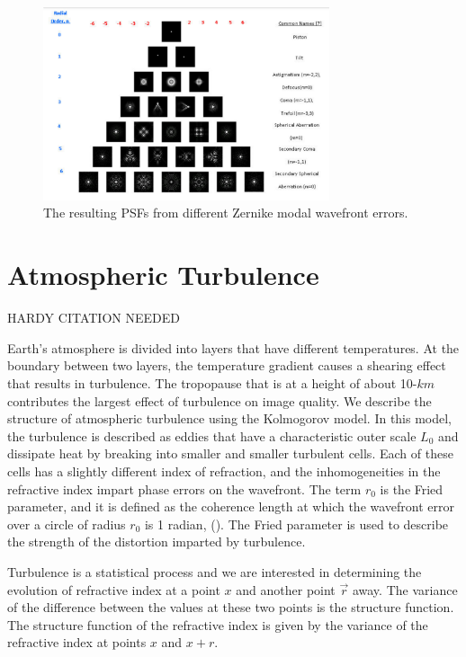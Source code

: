 \begin{figure}
    \centering
    \includegraphics[width=0.75\textwidth]{Chapter Materials/Introduction Materials/Introduction Figures/ZernikePSFs.png}
    \caption{The resulting PSFs from different Zernike modal wavefront errors.}
    \label{fig:zernikePSFs}
\end{figure}

\section{Atmospheric Turbulence}
HARDY CITATION NEEDED


Earth’s atmosphere is divided into layers that have different temperatures. At the boundary between two layers, the temperature gradient causes a shearing effect that results in turbulence. The tropopause that is at a height of about 10-$km$ contributes the largest effect of turbulence on image quality. We describe the structure of atmospheric turbulence using the Kolmogorov model. In this model, the turbulence is described as eddies that have a characteristic outer scale $L_0$ and dissipate heat by breaking into smaller and smaller turbulent cells. Each of these cells has a slightly different index of refraction, and the inhomogeneities in the refractive index impart phase errors on the wavefront. The term $r_0$ is the Fried parameter, and it is defined as the coherence length at which the wavefront error over a circle of radius $r_0$ is 1 radian, (\cite{roddier1999adaptive}). The Fried parameter is used to describe the strength of the distortion imparted by turbulence.  

Turbulence is a statistical process and we are interested in determining the evolution of refractive index at a point $x$ and another point $\Vec{r}$ away. The variance of the difference between the values at these two points is the structure function. The structure function of the refractive index is given by the variance of the refractive index at points $x$ and $x+r$.   

